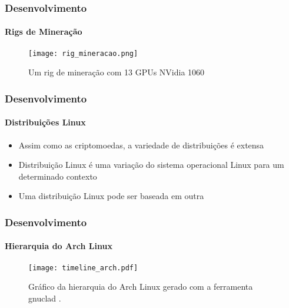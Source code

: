 \documentclass[aspectratio=43]{beamer}
\begin{document}
\begin{frame}
    \frametitle{Desenvolvimento}
    \framesubtitle{Rigs de Mineração}

    \begin{figure}[H]
        \caption{\label{fig:rig_mineracao}Um rig de mineração com 13 GPUs
        NVidia 1060}
        \begin{center}
            \texttt{[image: rig\_mineracao.png]}
        \end{center}
    \end{figure}
\end{frame}

\begin{frame}
    \frametitle{Desenvolvimento}
    \framesubtitle{Distribuições Linux}

    \begin{itemize}
        \item Assim como as criptomoedas, a variedade de distribuições
            é extensa

        \item Distribuição Linux é uma variação do sistema operacional
            Linux para um determinado contexto

        \item Uma distribuição Linux pode ser baseada em outra

    \end{itemize}
\end{frame}

\begin{frame}
    \frametitle{Desenvolvimento}
    \framesubtitle{Hierarquia do Arch Linux}

    \begin{figure}[H]
        \caption[Gráfico da hierarquia do Arch Linux]{\label{fig:hierarquia-arch}Gráfico da hierarquia do Arch
        Linux gerado com a ferramenta gnuclad \cite{Loli2017}.}
        \begin{center}
            \texttt{[image: timeline\_arch.pdf]}
        \end{center}
    \end{figure}
\end{frame}
\end{document}

